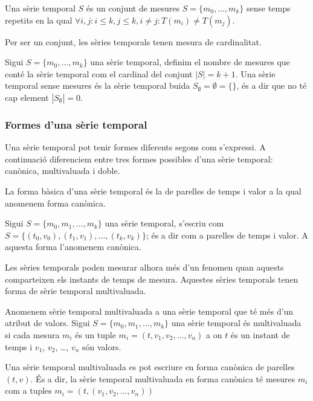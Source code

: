 \begin{definition}
  \label{def:serie_temporal}
  Una sèrie temporal $S$ és un conjunt de mesures
  $S=\{m_0,\ldots,m_k\}$ sense temps repetits en la qual
  $\forall i,j: i\leq k, j\leq k, i\neq j : T(m_i)\neq T(m_j)$.
\end{definition}

Per ser un conjunt, les sèries temporals tenen mesura de cardinalitat.
\begin{definition}[Cardinal]
  Sigui $S=\{m_0,\ldots,m_k\}$ una sèrie temporal, definim el nombre
  de mesures que conté la sèrie temporal com el cardinal del conjunt
  $|S|=k+1$. Una sèrie temporal sense mesures és la sèrie temporal
  buida $S_\emptyset= \emptyset = \{\}$, és a dir que no té cap element
  $|S_\emptyset|=0$.
\end{definition}



 
\subsubsection{Formes d'una sèrie temporal}

Una sèrie temporal pot tenir formes diferents segons com s'expressi.
A continuació diferenciem entre tres formes possibles d'una sèrie
temporal: canònica, multivaluada i doble.


La forma bàsica d'una sèrie temporal és la de parelles de temps i
valor a la qual anomenem forma canònica.
\begin{definition}
  Sigui $S = \{ m_0, m_1 , \dotsc, m_k \}$ una sèrie temporal,
  s'escriu com $S =  \{
  (t_0,v_0), (t_1,v_1), \dotsc, (t_k,v_k)\}$; és
  a dir com a parelles de temps i valor. A aquesta
  forma l'anomenem canònica.
\end{definition}


Les sèries temporals poden mesurar alhora més d'un fenomen quan
aquests comparteixen els instants de temps de mesura. Aquestes sèries
temporals tenen forma de sèrie temporal multivaluada.

\begin{definition}
  Anomenem sèrie temporal multivaluada a una sèrie temporal que té més
  d'un atribut de valors.  Sigui $S = \{ m_0, m_1 , \dotsc, m_k \}$
  una sèrie temporal és multivaluada si cada mesura $m_i$ és un tuple
  $m_i=(t,v_1,v_2,\dotsc,v_n)$ a on $t$ és un instant de temps i
  $v_1$, $v_2$, \dots, $v_n$ són valors. 

  Una sèrie temporal multivaluada es pot escriure en forma canònica de
  parelles $(t,v)$. És a dir, la sèrie temporal multivaluada en
  forma canònica té mesures $m_i$ com a tuples
  $m_i=(t,(v_1,v_2,\dotsc,v_n))$
\end{definition}


